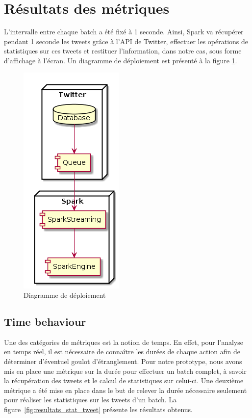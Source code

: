 \section{Résultats des métriques}
  L'intervalle entre chaque batch a été fixé à 1 seconde. Ainsi, Spark va récupérer pendant 1 seconde les tweets grâce à l'API de Twitter, effectuer les opérations de statistiques sur ces tweets et restituer l'information, dans notre cas, sous forme d'affichage à l'écran. Un diagramme de déploiement est présenté à la figure \ref{fig:diagramme de déploiement}.

    \begin{figure}
        \centering
        \includegraphics{images/diagramme-deploiement.png}
        \caption{Diagramme de déploiement}
        \label{fig:diagramme de déploiement}
    \end{figure}

  \subsection{Time behaviour}
    Une des catégories de métriques est la notion de temps. En effet, pour l'analyse en temps réel, il est nécessaire de connaître les durées de chaque action afin de déterminer d'éventuel goulot d'étranglement. Pour notre prototype, nous avons mis en place une métrique sur la durée pour effectuer un batch complet, à savoir la récupération des tweets et le calcul de statistiques sur celui-ci. Une deuxième métrique a été mise en place dans le but de relever la durée nécessaire seulement pour réaliser les statistiques sur les tweets d'un batch. La figure~\ref{fig:resultats_stat_tweet} présente les résultats obtenus. \\

